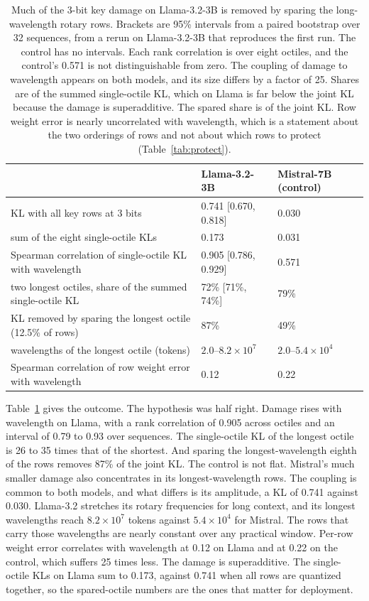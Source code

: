 \documentclass[10pt]{article}
\begin{document}
\begin{table}[t]
\centering
\small
\begin{tabular}{lll}
\toprule
 & Llama-3.2-3B & Mistral-7B (control) \\
\midrule
KL with all key rows at 3 bits & 0.741 [0.670, 0.818] & 0.030 \\
sum of the eight single-octile KLs & 0.173 & 0.031 \\
Spearman correlation of single-octile KL with wavelength & 0.905 [0.786, 0.929] & 0.571 \\
two longest octiles, share of the summed single-octile KL & 72\% [71\%, 74\%] & 79\% \\
KL removed by sparing the longest octile (12.5\% of rows) & 87\% & 49\% \\
wavelengths of the longest octile (tokens) & $2.0$--$8.2\times10^{7}$ & $2.0$--$5.4\times10^{4}$ \\
Spearman correlation of row weight error with wavelength & 0.12 & 0.22 \\
\bottomrule
\end{tabular}
\caption{Much of the 3-bit key damage on Llama-3.2-3B is removed by sparing the long-wavelength
rotary rows. Brackets are 95\% intervals from a paired bootstrap over 32 sequences, from a
rerun on Llama-3.2-3B that reproduces the first run. The control has no intervals. Each rank
correlation is over eight octiles, and the
control's 0.571 is not distinguishable from zero. The
coupling of damage to wavelength appears on both models, and its size differs by a factor of 25.
Shares are of the summed single-octile KL, which on Llama is far below the joint KL because the
damage is superadditive. The spared share is of the joint KL. Row weight error is nearly
uncorrelated with wavelength, which is a statement about the two orderings of rows and not about
which rows to protect (Table~\ref{tab:protect}).}
\label{tab:wave}
\end{table}

Table~\ref{tab:wave} gives the outcome. The hypothesis was half right. Damage rises with
wavelength on Llama, with a rank correlation of 0.905 across octiles and an interval of 0.79 to
0.93 over sequences. The single-octile KL of the longest octile is 26 to 35 times that of the
shortest. And sparing the
longest-wavelength eighth of the rows removes 87\% of the joint KL. The control is not flat.
Mistral's much smaller damage also concentrates in its longest-wavelength rows. The coupling is
common to both models, and what differs is its amplitude, a KL of 0.741 against 0.030. Llama-3.2
stretches its rotary frequencies for long context, and its longest wavelengths reach
$8.2\times10^{7}$ tokens against $5.4\times10^{4}$ for Mistral. The rows that carry those
wavelengths are nearly constant over any practical window. Per-row weight error correlates with
wavelength at 0.12 on Llama and at 0.22 on the control, which suffers 25 times less. The damage is
superadditive. The single-octile KLs on Llama sum to 0.173, against 0.741 when all rows are
quantized together, so the spared-octile numbers are the ones that matter for deployment.
\end{document}
